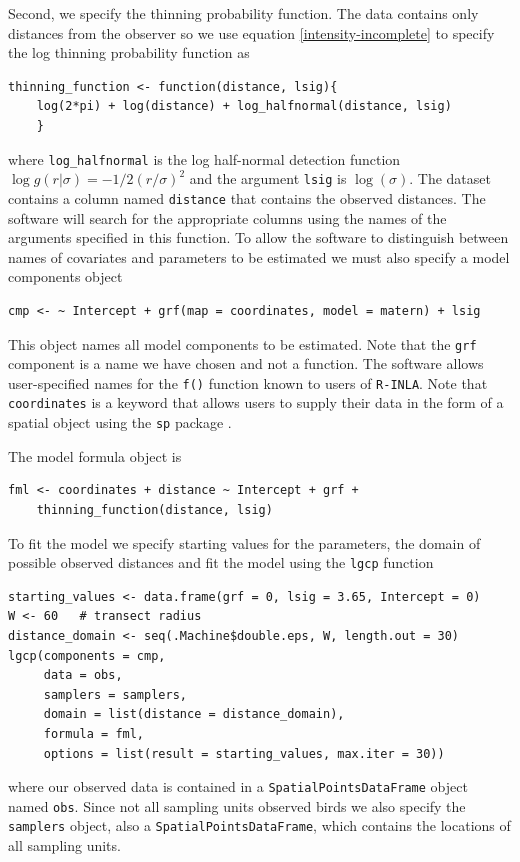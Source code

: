 \documentclass[preprint,12pt]{elsarticle}
\begin{document}
Second, we specify the thinning probability function.  The data contains only distances from the observer so we use equation \eqref{intensity-incomplete} to specify the log thinning probability function as
\begin{lstlisting}
thinning_function <- function(distance, lsig){
    log(2*pi) + log(distance) + log_halfnormal(distance, lsig)
    }
\end{lstlisting}
where \texttt{log\_halfnormal} is the log half-normal detection function $\log g(r | \sigma) = -1/2(r/\sigma)^2$ and the argument \texttt{lsig} is $\log(\sigma)$.  The dataset contains a column named \texttt{distance} that contains the observed distances.  The software will search for the appropriate columns using the names of the arguments specified in this function.  To allow the software to distinguish between names of covariates and parameters to be estimated we must also specify a model components object
\begin{lstlisting}
cmp <- ~ Intercept + grf(map = coordinates, model = matern) + lsig 
\end{lstlisting} 
This object names all model components to be estimated.  Note that the \texttt{grf} component is a name we have chosen and not a function.  The software allows user-specified names for the \texttt{f()} function known to users of \texttt{R-INLA}. Note that \texttt{coordinates} is a keyword that allows users to supply their data in the form of a spatial object using the \texttt{sp} package \citep{pebesma_spatial_2005}.  

The model formula object is
\begin{lstlisting}
fml <- coordinates + distance ~ Intercept + grf +
	thinning_function(distance, lsig)
\end{lstlisting}
To fit the model we specify starting values for the parameters, the domain of possible observed distances and fit the model using the \texttt{lgcp} function
\begin{lstlisting}
starting_values <- data.frame(grf = 0, lsig = 3.65, Intercept = 0)
W <- 60   # transect radius
distance_domain <- seq(.Machine$double.eps, W, length.out = 30)
lgcp(components = cmp, 
     data = obs,
     samplers = samplers,
     domain = list(distance = distance_domain),
     formula = fml,
     options = list(result = starting_values, max.iter = 30))
\end{lstlisting}
where our observed data is contained in a \texttt{SpatialPointsDataFrame} object named \texttt{obs}.  Since not all sampling units observed birds we also specify the \texttt{samplers} object, also a \texttt{SpatialPointsDataFrame}, which contains the locations of all sampling units.   
\end{document}
